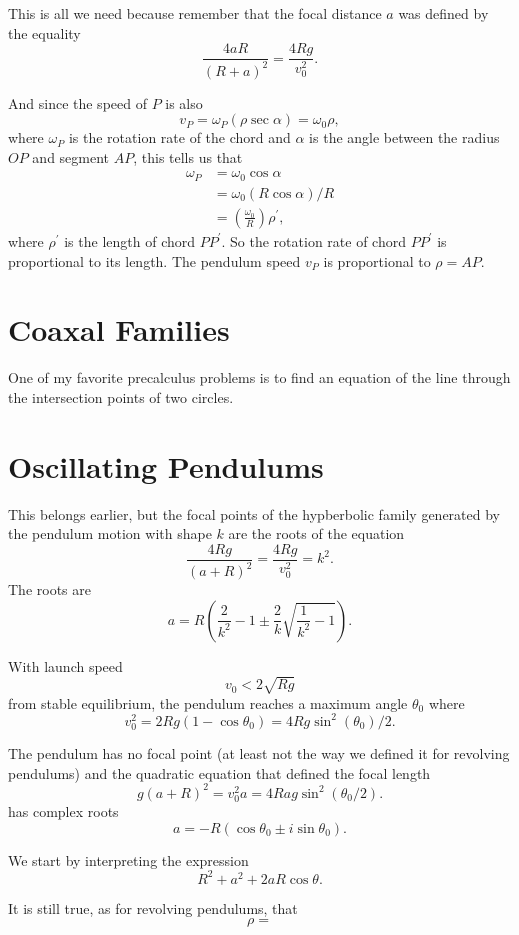 \documentclass{ximera}
\begin{document}
This is all we need because remember that the focal distance $a$ was defined by the equality
\[
   \frac{4aR}{(R+a)^2} = \frac{4Rg}{v_0^2} .
\]

And since the speed of $P$ is also
\[
  v_P = \omega_P (\rho \sec\alpha)  = \omega_0 \rho , 
\]
where $\omega_P$ is the rotation rate of the chord and $\alpha$ is the angle between the radius $OP$ and segment $AP$, this tells us that
\begin{align*}
\omega_P &= \omega_0  \cos  \alpha  \\
                &= \omega_0 (R\cos \alpha) / R \\
                & = \left( \frac{\omega_0}{R} \right) \rho^\prime ,
\end{align*}
where $\rho^\prime$ is the length of chord $PP^\prime$. So the rotation rate of chord $PP^\prime$ is proportional to its length. The pendulum speed $v_P$ is proportional to $\rho = AP$.


\section{Coaxal Families}
One of my favorite precalculus problems is to find an equation of the line through the intersection points of two circles.


\section{Oscillating Pendulums}
This belongs earlier, but the focal points of the hypberbolic family generated by the pendulum motion with shape $k$ are the roots of the equation
\[
      \frac{4Rg}{(a+R)^2} = \frac{4Rg}{v_0^2} = k^2.
\]
The roots are
\[
      a = R \left(\frac{2}{k^2} -1  \pm \frac{2}{k}\sqrt{\frac{1}{k^2}-1} \right) . 
\]

With launch speed
\[
   v_0 < 2\sqrt{Rg}
\]
from stable equilibrium, the pendulum reaches a maximum angle $\theta_0$ where 
\[
    v_0^2 = 2Rg(1-\cos\theta_0) = 4Rg\sin^2 (\theta_0)/2 .
\]

The pendulum has no focal point (at least not the way we defined it for revolving pendulums) and the quadratic equation that defined the focal length 
\[
     g(a+R)^2 = v_0^2 a = 4Rag\sin^2 (\theta_0/2) .
\]
has complex roots
\[
     a = -R(\cos \theta_0 \pm i \sin \theta_0).
\]

We start by interpreting the expression
\[
       R^2 + a^2 + 2aR\cos\theta.
\]


It is still true, as for revolving pendulums, that
\[
  \rho = 
\]
\end{document}
